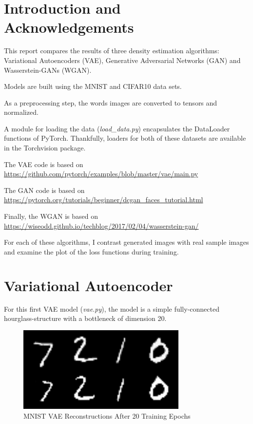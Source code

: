 \documentclass[letterpaper, 10pt]{article}
\begin{document}
\section{Introduction and Acknowledgements}

This report compares the results of three density estimation algorithms:
Variational Autoencoders (VAE), Generative Adversarial Networks (GAN) and Wasserstein-GANs (WGAN).

Models are built using the MNIST and CIFAR10 data sets.

As a preprocessing step, the words images are converted to tensors and normalized.

A module for loading the data ({\em load\_data.py}) encapsulates the DataLoader functions of PyTorch.
Thankfully, loaders for both of these datasets are available in the Torchvision package.

The VAE code is based on \url{https://github.com/pytorch/examples/blob/master/vae/main.py}

The GAN code is based on \url{https://pytorch.org/tutorials/beginner/dcgan_faces_tutorial.html}

Finally, the WGAN is based on \url{https://wiseodd.github.io/techblog/2017/02/04/wasserstein-gan/}

For each of these algorithms, I contrast generated images with real sample images and examine the plot of the loss functions during training.

\section{Variational Autoencoder}

For this first VAE model ({\em vae.py}), the model is a simple fully-connected hourglass-structure with a bottleneck of dimension 20.

\begin{figure}[h]
\caption{MNIST VAE Reconstructions After 20 Training Epochs}
\centering
\includegraphics[width=0.75\textwidth]{vae_reconstruction_20_epochs}
\end{figure}
\end{document}
